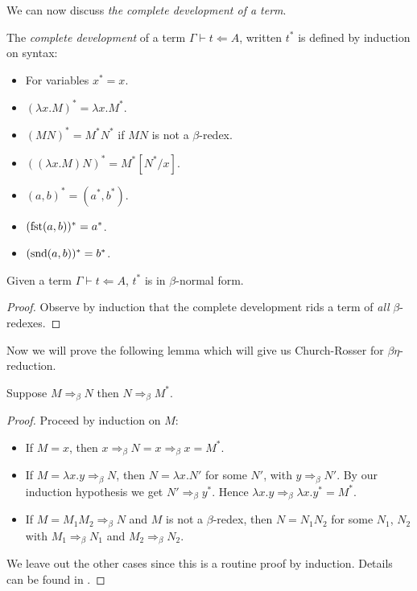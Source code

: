 We can now discuss \emph{the complete development of a term}.

\begin{defin}
    The \emph{complete development} of a term $\Gamma \vdash t \Leftarrow A$, written $t^*$ is defined by induction on syntax:
    \begin{itemize}
        \item For variables $x^* = x$.
        \item $(\lambda x . M)^* = \lambda x . M^*$.
        \item $(M N)^* = M^* N^*$ if $MN$ is not a $\beta$-redex.
        \item $((\lambda x . M)N)^* = M^* [N^* / x]$.
        \item $(a, b)^* = (a^*, b^*)$.
        \item $(\mathrm{fst} (a, b))^* = a^*$.
        \item $(\mathrm{snd} (a, b))^* = b^*$.
    \end{itemize}
\end{defin}

\begin{lemma}
    Given a term $\Gamma \vdash t \Leftarrow A$, $t^*$ is in $\beta$-normal form.
\end{lemma}

\begin{proof}
    Observe by induction that the complete development rids a term of \emph{all} $\beta$-redexes.
\end{proof}

Now we will prove the following lemma which will give us Church-Rosser for $\beta \eta$-reduction.

\begin{lemma}\label{cd_lemma}
    Suppose $M \Rightarrow_\beta N$ then $N \Rightarrow_\beta M^*$.
\end{lemma}

\begin{proof}
    Proceed by induction on $M$:
    \begin{itemize}
        \item If $M = x$, then $x \Rightarrow_\beta N  =x \Rightarrow_\beta x = M^*$.
        \item If $M = \lambda x . y \Rightarrow_\beta N$, then $N = \lambda x . N'$ for some $N'$, with $y \Rightarrow_\beta N'$. By our induction hypothesis we get $N' \Rightarrow_\beta y^*$. Hence $\lambda x . y \Rightarrow_\beta \lambda x . y^* = M^*$.
        \item If $M = M_1 M_2 \Rightarrow_\beta N$ and $M$ is not a $\beta$-redex, then $N = N_1 N_2$ for some $N_1$, $N_2$ with $M_1 \Rightarrow_\beta N_1$ and $M_2 \Rightarrow_\beta N_2$.
    \end{itemize}
    
    We leave out the other cases since this is a routine proof by induction. Details can be found in \cite{TakahashiM1989PRIL}.
\end{proof}

